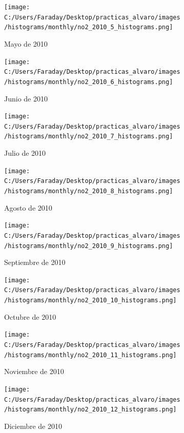 \documentclass[12pt]{article}
\begin{document}
\begin{figure}[H]
\centering
\begin{subfigure}[h]{0.45\textwidth}
\texttt{[image: C:/Users/Faraday/Desktop/practicas\_alvaro/images/histograms/monthly/no2\_2010\_5\_histograms.png]}
\caption{Mayo de 2010}
\label{fig:hist-mon-1-5-2010}
\end{subfigure}
%
\begin{subfigure}[H]{0.45\textwidth}
\texttt{[image: C:/Users/Faraday/Desktop/practicas\_alvaro/images/histograms/monthly/no2\_2010\_6\_histograms.png]}
\caption{Junio de 2010}
\label{fig:hist-mon-1-6-2010}
\end{subfigure}
\caption{}
\end{figure}

\newpage

\begin{figure}[H]
\centering
\begin{subfigure}[h]{0.45\textwidth}
\texttt{[image: C:/Users/Faraday/Desktop/practicas\_alvaro/images/histograms/monthly/no2\_2010\_7\_histograms.png]}
\caption{Julio de 2010}
\label{fig:hist-mon-1-7-2010}
\end{subfigure}
%
\begin{subfigure}[H]{0.45\textwidth}
\texttt{[image: C:/Users/Faraday/Desktop/practicas\_alvaro/images/histograms/monthly/no2\_2010\_8\_histograms.png]}
\caption{Agosto de 2010}
\label{fig:hist-mon-1-8-2010}
\end{subfigure}
\caption{}
\end{figure}

\begin{figure}[H]
\centering
\begin{subfigure}[h]{0.45\textwidth}
\texttt{[image: C:/Users/Faraday/Desktop/practicas\_alvaro/images/histograms/monthly/no2\_2010\_9\_histograms.png]}
\caption{Septiembre de 2010}
\label{fig:hist-mon-1-9-2010}
\end{subfigure}
%
\begin{subfigure}[H]{0.45\textwidth}
\texttt{[image: C:/Users/Faraday/Desktop/practicas\_alvaro/images/histograms/monthly/no2\_2010\_10\_histograms.png]}
\caption{Octubre de 2010}
\label{fig:hist-mon-1-10-2010}
\end{subfigure}
\caption{}
\end{figure}

\begin{figure}[H]
\centering
\begin{subfigure}[h]{0.45\textwidth}
\texttt{[image: C:/Users/Faraday/Desktop/practicas\_alvaro/images/histograms/monthly/no2\_2010\_11\_histograms.png]}
\caption{Noviembre de 2010}
\label{fig:hist-mon-1-11-2010}
\end{subfigure}
%
\begin{subfigure}[H]{0.45\textwidth}
\texttt{[image: C:/Users/Faraday/Desktop/practicas\_alvaro/images/histograms/monthly/no2\_2010\_12\_histograms.png]}
\caption{Diciembre de 2010}
\label{fig:hist-mon-1-12-2010}
\end{subfigure}
\caption{}
\end{figure}
\end{document}
